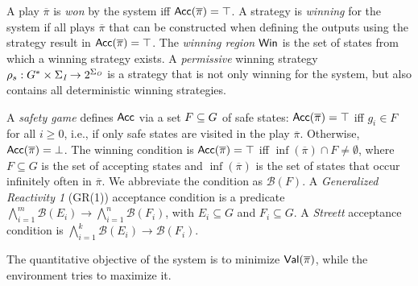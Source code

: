 A play $\overline{\pi}$ is \emph{won} by the system iff $\mathsf{Acc}(\overline{\pi})=\top$.
 A strategy is \emph{winning} for the system if all plays $\overline{\pi}$ that can be
constructed when defining the outputs using the strategy result in
$\mathsf{Acc}(\overline{\pi})=\top$. The \emph{winning region} $\mathsf{Win}$ is the set of states
from which a winning strategy exists.
A \emph{permissive} winning strategy  $\rho_s:
G^* \times \Sigma_{\textit{I}} \rightarrow 2^{\Sigma_{\textit{O}}}$ is a strategy that is not only winning for the system, but also contains all deterministic winning strategies.

A \emph{safety game} defines $\mathsf{Acc}$ via a set $F\subseteq G$ of
safe states: $\mathsf{Acc}(\overline{\pi})=\top$ iff $g_i \in F$ for all $i \geq 0$, i.e., if only safe states are visited in the play $\overline{\pi}$. Otherwise, $\mathsf{Acc}(\overline{\pi})=\bot$.
%
The \emph{\buchi} winning condition is $\mathsf{Acc}(\overline{\pi})=\top$ iff $\inf(\overline{\pi})
\cap F \neq \emptyset$, where $F \subseteq G$ is
the set of accepting states and $\inf(\overline{\pi})$ is the set of states that occur infinitely often in $\overline{\pi}$.
We abbreviate the \buchi condition as $\mathcal{B}(F)$.
A \emph{Generalized Reactivity 1} (GR(1))
acceptance condition is a predicate $\bigwedge_{i=1}^{m} \mathcal{B}(E_{i}) \rightarrow \bigwedge_{i=1}^{n} \mathcal{B}(F_{i})$, with
$E_i \subseteq G$ and $F_i \subseteq G$.
 A \emph{Streett}
acceptance condition 
is 
 $\bigwedge_{i=1}^{k} \mathcal{B}(E_{i}) \rightarrow \mathcal{B}(F_{i})$.

The quantitative objective of the system is to minimize $\mathsf{Val}(\overline{\pi})$, while the environment
 tries to maximize it.
%
\iffalse MEAN-PAYOFF
A \emph{mean-payoff game} is a game where $\Val$ is defined via an edge labeling function $r :
\delta \rightarrow \{-W,\dots, W\}$, which assigns values between $-W$ and $W$ to edges. For a play $\pi =
e_0 e_1 e_2 \dots \in \delta^\omega, \Val(\overline{\pi}) = \lim \sup_{n\rightarrow\infty} \frac{1}{n+1} \sum_{i=0}^{n} r(e_i)$.
\fi


